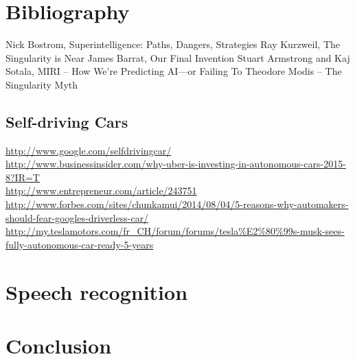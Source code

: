 \documentclass[12pt]{article}
\begin{document}
\section{Bibliography}
Nick Bostrom, Superintelligence: Paths, Dangers, Strategies
Ray Kurzweil, The Singularity is Near
James Barrat, Our Final Invention
Stuart Armstrong and Kaj Sotala, MIRI – How We’re Predicting AI—or Failing To
Theodore Modis – The Singularity Myth

\subsection{Self-driving Cars}
\url{http://www.google.com/selfdrivingcar/}\\
\url{http://www.businessinsider.com/why-uber-is-investing-in-autonomous-cars-2015-8?IR=T}\\
\url{http://www.entrepreneur.com/article/243751}\\
\url{http://www.forbes.com/sites/chunkamui/2014/08/04/5-reasons-why-automakers-should-fear-googles-driverless-car/}\\
\url{http://my.teslamotors.com/fr_CH/forum/forums/tesla%E2%80%99s-musk-sees-fully-autonomous-car-ready-5-years}\\

\section{Speech recognition}


\pagebreak


\section*{Conclusion}\label{conclusion}

\pagebreak


\end{document}
